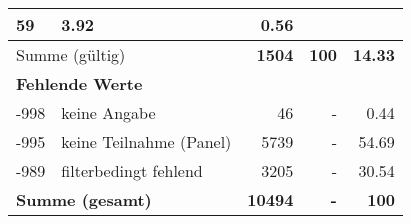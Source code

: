 \begin{longtable}{lXrrr}
       \num{59} &
       \num[round-mode=places,round-precision=2]{3.92} &
         \num[round-mode=places,round-precision=2]{0.56} \\
     \midrule
     \multicolumn{2}{l}{Summe (gültig)} &
       \textbf{\num{1504}} &
     \textbf{\num{100}} &
       \textbf{\num[round-mode=places,round-precision=2]{14.33}} \\
     \multicolumn{5}{l}{\textbf{Fehlende Werte}}\\
       -998 &
       keine Angabe &
         \num{46} &
        - &
         \num[round-mode=places,round-precision=2]{0.44} \\
       -995 &
       keine Teilnahme (Panel) &
         \num{5739} &
        - &
         \num[round-mode=places,round-precision=2]{54.69} \\
       -989 &
       filterbedingt fehlend &
         \num{3205} &
        - &
         \num[round-mode=places,round-precision=2]{30.54} \\
     \midrule
     \multicolumn{2}{l}{\textbf{Summe (gesamt)}} &
          \textbf{\num{10494}} &
        \textbf{-} &
        \textbf{\num{100}} \\
     \bottomrule
     \end{longtable}
     
